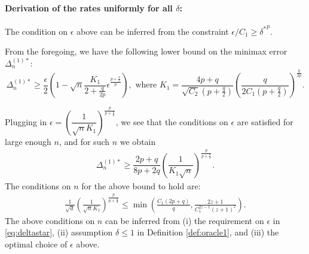 % 
% 
% 

\paragraph{Derivation of the rates uniformly for all $\delta$:}

The condition on $\epsilon$ above can be inferred from the constraint $\epsilon/C_1 \ge {\delta^*}^p$.

From the foregoing, we have the following lower bound on the minimax error $\Delta_n^{(1)*}$:
\[
\Delta_n^{(1)*} \ge \dfrac{\epsilon}{2} \left(1 - \sqrt{n}  \dfrac{K_1}{2+\frac{q}{2p}} \epsilon^{\frac{p+\tfrac{q}{2}}{p}}\right), \text{ where } K_1 = \dfrac{4p+q}{\sqrt{C_2}(p+\tfrac{q}{2})} \left(\dfrac{q}{2C_1(p+\tfrac{q}{2})}\right)^{\frac{q}{2p}}.
\]
 
Plugging in $\epsilon = \left(\dfrac{1}{\sqrt{n} K_1} \right)^{\frac{p}{p+\frac{q}{2}}}$, we see that the conditions on $\epsilon$ are satisfied for large enough $n$, and for such $n$ we obtain
\begin{align}
\Delta_n^{(1)*} \ge \dfrac{2p+q}{8p+2q}\left(\dfrac{1}{ K_1 \sqrt n}\right)^{\frac{p}{p+\frac{q}{2}}}.
\label{eq:lb-pq}
\end{align}
The conditions on $n$ for the above bound to hold are:
\begin{align}
\frac{1}{\sqrt{d}}\left(\frac{1}{\sqrt{n} K_1} \right)^{\frac{p}{p+\frac{q}{2}}}\le \min\left( \frac{C_1 (2p+q)}{q}, \frac{2z+1}{C_1^{2z-1}(z+1)^z}\right).
\end{align}
The above conditions on $n$ can be inferred from (i) the requirement on  $\epsilon$ in \eqref{eq:deltastar}, (ii) assumption $\delta \le 1$ in Definition \ref{def:oracle1},  and (iii) the optimal choice of $\epsilon$ above.

